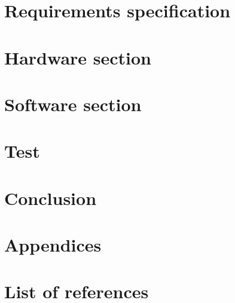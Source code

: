 



\renewcommand\chaptername{Chapter}
\renewcommand\contentsname{Table of Contents}
\renewcommand\figurename{Figure}
\renewcommand\tablename{Table} 


\cleardoublepage

\frontmatter




\cleardoublepage

\tableofcontents*
\newpage
\printnomenclature
\renewcommand*\listfigurename{List of Figures}
\renewcommand*\listtablename{List of Tables}

\mainmatter

\chapter{Requirements specification}

\chapter{Hardware section}



\chapter{Software section}



\chapter{Test}

\chapter{Conclusion}

\chapter{Appendices}

\chapter{List of references}

\newpage
\listoffigures
{}
\newpage
\listoftables
{}
\newpage
\printbibliography

